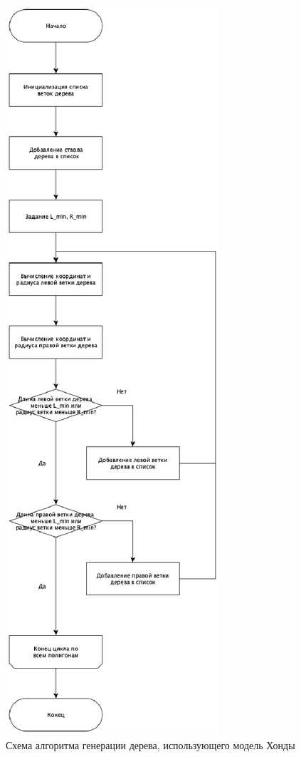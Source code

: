 \documentclass[54pt, a4paper]{article}
\begin{document}
	\begin{figure}[ht!]
		\centering
		\includegraphics[scale=1.1]{img/Honda.eps}
		\caption{Схема алгоритма генерации дерева, использующего модель Хонды}
		\label{ris:alg_Honda}
	\end{figure}
	
\end{document}
